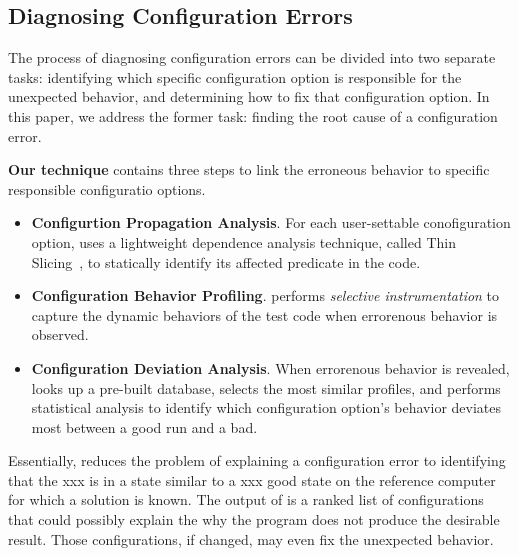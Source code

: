 





\subsection{Diagnosing Configuration Errors}

The process of diagnosing configuration errors can be divided into two
separate tasks: identifying which specific configuration option is
responsible for the unexpected behavior, and determining how to fix that
configuration option. In this paper, we address the former task: finding
the root cause of a configuration error.

\textbf{Our technique} contains three steps to 
link the erroneous behavior to specific responsible configuratio options.

\begin{itemize}
\item \textbf{Configurtion Propagation Analysis}. For
each user-settable conofiguration option, \ourtool
uses a lightweight dependence analysis technique, called Thin Slicing~\cite{Sridharan:2007},
to statically identify its affected predicate in the code.

\item \textbf{Configuration Behavior Profiling}. \ourtool
performs \textit{selective instrumentation} to capture the
dynamic behaviors of the test code when errorenous behavior
is observed.

\item \textbf{Configuration Deviation Analysis}.
When errorenous behavior is revealed, \ourtool looks up a
pre-built database, selects the most similar profiles, and
performs statistical analysis to identify which configuration
option's behavior deviates most between a good run and a bad.

\end{itemize}

Essentially, \ourtool reduces the problem of explaining a
configuration error to
identifying that the xxx is in a state similar to a xxx good state
on the reference computer for which a solution is known.
The output of \ourtool is a ranked list of
configurations that could possibly explain the why the program does not produce the desirable result. Those
configurations, if changed, may even fix the unexpected behavior.

